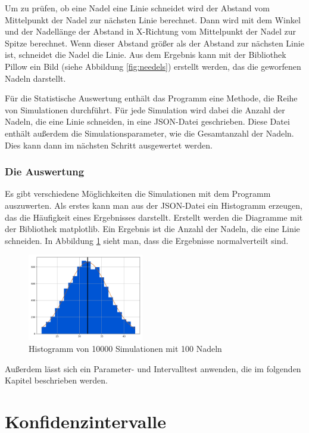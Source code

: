 \documentclass[10pt,twocolumn]{scrartcl}
\begin{document}
			Um zu prüfen, ob eine Nadel eine Linie schneidet wird der Abstand vom Mittelpunkt der Nadel zur nächsten Linie berechnet. Dann wird mit dem Winkel und der Nadellänge der Abstand in X-Richtung vom Mittelpunkt der Nadel zur Spitze berechnet. Wenn dieser Abstand größer als der Abstand zur nächsten Linie ist, schneidet die Nadel die Linie.
			Aus dem Ergebnis kann mit der Bibliothek Pillow\cite{Pillow} ein Bild (siehe Abbildung \ref{fig:needels}) erstellt werden, das die geworfenen Nadeln darstellt.

			Für die Statistische Auswertung enthält das Programm eine Methode, die Reihe von Simulationen durchführt. Für jede Simulation wird dabei die Anzahl der Nadeln, die eine Linie schneiden, in eine JSON-Datei geschrieben. Diese Datei enthält außerdem die Simulationsparameter, wie die Gesamtanzahl der Nadeln. Dies kann dann im nächsten Schritt ausgewertet werden.

		\subsubsection*{Die Auswertung}
			Es gibt verschiedene Möglichkeiten die Simulationen mit dem Programm auszuwerten. Als erstes kann man aus der JSON-Datei ein Histogramm erzeugen, das die Häufigkeit eines Ergebnisses darstellt. Erstellt werden die Diagramme mit der Bibliothek matplotlib\cite{matplotlib}. Ein Ergebnis ist die Anzahl der Nadeln, die eine Linie schneiden. In Abbildung \ref{fig:hist} sieht man, dass die Ergebnisse normalverteilt sind.

			\begin{figure}[htb]
				\centering
				\includegraphics[width=0.45\textwidth]{images/histogram_10000.png}
				\caption{Histogramm von 10000 Simulationen mit 100 Nadeln}
				\label{fig:hist}
			\end{figure}

			Außerdem lässt sich ein Parameter- und Intervalltest anwenden, die im folgenden Kapitel beschrieben werden.

\section{Konfidenzintervalle}
\end{document}
